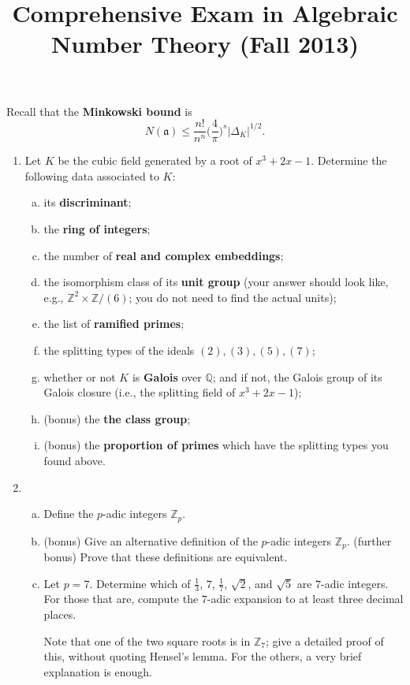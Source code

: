 \documentclass[12pt]{amsart}
\title{Comprehensive Exam in Algebraic Number Theory (Fall 2013)}
\begin{document}
\maketitle

Recall that the {\bf Minkowski bound} is
\[
N(\mathfrak{a}) \leq \frac{n!}{n^n} \bigg(\frac{4}{\pi}\bigg)^s |\Delta_K|^{1/2}.
\]

\begin{enumerate}[1.]
\item
Let $K$ be the cubic field generated by a root of $x^3 + 2x - 1$. Determine the
following data associated to $K$:
\begin{enumerate}[(a)]
\item its {\bf discriminant};
\item the {\bf ring of integers};
\item the number of {\bf real and complex embeddings};
\item the isomorphism class of its {\bf unit group} (your answer should look like,
e.g., $\mathbb{Z}^2 \times \mathbb{Z}/(6)$; you do not need to find the actual units);
\item the list of {\bf ramified primes};
\item the splitting types of the ideals $(2), (3), (5), (7)$;
\item whether or not $K$ is {\bf Galois} over $\mathbb{Q}$; and if not, the Galois group
of its Galois closure (i.e., the splitting field of $x^3 + 2x - 1$);
\item (bonus) the {\bf the class group};
\item (bonus) the {\bf proportion of primes} which have the splitting types you found above.
\end{enumerate}
\vskip 0.5cm
\item
\begin{enumerate}[(a)]
\item Define the $p$-adic integers $\mathbb{Z}_p$.
\item (bonus) Give an alternative definition of the $p$-adic integers $\mathbb{Z}_p$.
(further bonus) Prove that these definitions are equivalent.
\item Let $p = 7$. Determine which of $\frac{1}{3}$, $7$, $\frac{1}{7}$, $\sqrt{2}$,
and $\sqrt{5}$ are $7$-adic integers. For those that are, compute the $7$-adic expansion
to at least three decimal places. 

Note that one of the two square roots is in $\mathbb{Z}_7$; give a detailed proof of this, without
quoting Hensel's lemma. For the others, a very brief explanation is enough.
\end{enumerate}


\end{enumerate}
\end{document}
